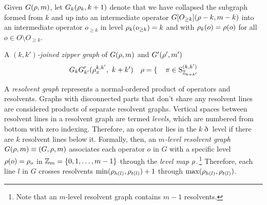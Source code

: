 \documentclass[11pt]{article}
\numberwithin{equation}{section}
\begin{document}
\begin{ntt}
Given
$
  G(\rho ,m)
$,
let
$
  G_k(\rho _k,k+1)
$
denote that we have collapsed the subgraph formed from $k$ and up into an intermediate operator
$
  G[O_{\geq k}](\rho -k,m-k)
$
into an intermediate operator
$
  o_{\geq k}
$
in level
$
  \rho _k(o_{\geq k})
=
  k
$
and with
$
  \rho _k(o)
=
  \rho (o)
$
for all
$
  o
\in
  O
  \setminus
  O_{\geq k}
$.
\end{ntt}

\begin{dfn}
\label{dfn:resolvent-graph}
A \textit{$(k,k')$-joined zipper graph} of $G(\rho ,m)$ and $G'(\rho ',m')$ 
\begin{align}
  G_k
  G_{k'}'
  (
    \rh_\pi^{k,k'},\
    k+k'
  )
&&
  \rh
=
\left\{
\begin{array}{r@{\ }l}
\end{array}
\right.
&&
  \pi
\in
  \mr{S}_{\mb{Z}_{k+k'}}^{(k,k')}
\end{align}
\end{dfn}

\begin{dfn}
\label{dfn:insertion-graph}
\end{dfn}

\begin{dfn}\label{dfn:resolvent-graph}
A \textit{resolvent graph} represents a normal-ordered product of operators and resolvents.
Graphs with disconnected parts that don't share any resolvent lines are considered products of separate resolvent graphs.
Vertical spaces between resolvent lines in a resolvent graph are termed \textit{levels}, which are numbered from bottom with zero indexing.
Therefore, an operator lies in the $k\eth$ level if there are $k$ resolvent lines below it.
Formally, then, an \textit{$m$-level resolvent graph} $G(\rho ,m)\equiv(G,\rho ,m)$ associates each operator $o$ in $G$ with a specific level $\rho (o)=\rho _o$ in $\mathbb{Z}_m=\{0,1,\ldots,m-1\}$ through the \textit{level map} $\rho $.\,\footnote{
  Note that an $m$-level resolvent graph contains $m-1$ resolvents.
}
Therefore, each line $l$ in $G$ crosses resolvents
$
  \mathrm{min}(\rho _{h(l)},\rho _{t(l)}) + 1
$
through
$
  \mathrm{max}(\rho _{h(l)},\rho _{t(l)})
$.
\end{dfn}
\end{document}
